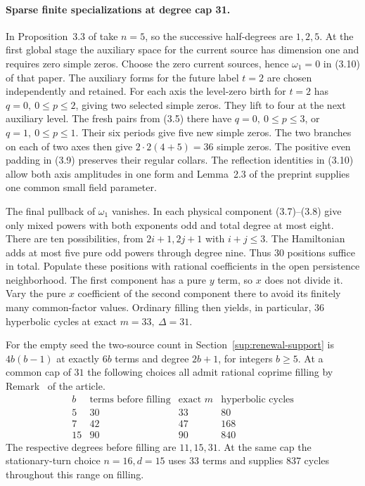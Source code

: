 \paragraph{Sparse finite specializations at degree cap 31.}
In Proposition~3.3 of \cite{LuMechanical} take \(n=5\), so the successive half-degrees are \(1,2,5\). At the first global stage the auxiliary space for the current source has dimension one and requires zero simple zeros. Choose the zero current sources, hence \(\omega_1=0\) in (3.10) of that paper. The auxiliary forms for the future label \(t=2\) are chosen independently and retained. For each axis the level-zero birth for \(t=2\) has \(q=0,\ 0\le p\le2\), giving two selected simple zeros. They lift to four at the next auxiliary level. The fresh pairs from (3.5) there have \(q=0,\ 0\le p\le3\), or \(q=1,\ 0\le p\le1\). Their six periods give five new simple zeros. The two branches on each of two axes then give \(2\cdot2(4+5)=36\) simple zeros. The positive even padding in (3.9) preserves their regular collars. The reflection identities in (3.10) allow both axis amplitudes in one form and Lemma~2.3 of the preprint supplies one common small field parameter.

The final pullback of \(\omega_1\) vanishes. In each physical component (3.7)--(3.8) give only mixed powers with both exponents odd and total degree at most eight. There are ten possibilities, from \(2i+1,2j+1\) with \(i+j\le3\). The Hamiltonian adds at most five pure odd powers through degree nine. Thus 30 positions suffice in total. Populate these positions with rational coefficients in the open persistence neighborhood. The first component has a pure \(y\) term, so \(x\) does not divide it. Vary the pure \(x\) coefficient of the second component there to avoid its finitely many common-factor values. Ordinary filling then yields, in particular, 36 hyperbolic cycles at exact \(m=33,\ \Delta=31\).

For the empty seed the two-source count in Section~\ref{sup:renewal-support} is \(4b(b-1)\) at exactly \(6b\) terms and degree \(2b+1\), for integers \(b\ge5\). At a common cap of \(31\) the following choices all admit rational coprime filling by Remark~ of the article.
\[
\begin{array}{c|ccc}
 b & \text{terms before filling} & \text{exact }m & \text{hyperbolic cycles}\\ \hline
 5 & 30 & 33 & 80\\
 7 & 42 & 47 & 168\\
 15& 90 & 90 & 840
\end{array}
\]
The respective degrees before filling are \(11,15,31\). At the same cap the stationary-turn choice \(n=16,d=15\) uses 33 terms and supplies 837 cycles throughout this range on filling.

